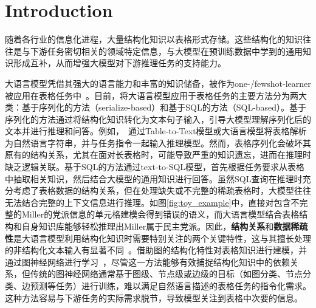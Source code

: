 \section{Introduction}
\begin{CJK}{UTF8}{gkai}  
随着各行业的信息化进程，大量结构化知识以表格形式存储。这些结构化的知识往往是与下游任务密切相关的领域特定信息，与大模型在预训练数据中学到的通用知识形成互补，从而增强大模型对下游推理任务的支持能力。

大语言模型凭借其强大的语言能力和丰富的知识储备，被作为one-/fewshot-learner被应用在表格任务中~\cite{?}。目前，将大语言模型应用于表格任务的主要方法分为两大类：基于序列化的方法（serialize-based）和基于SQL的方法（SQL-based）。基于序列化的方法通过将结构化知识转化为文本句子输入，引导大模型理解序列化后的文本并进行推理和问答。例如，~\cite{?}通过Table-to-Text模型或大语言模型将表格解析为自然语言字符串，并与任务指令一起输入推理模型。然而，表格序列化会破坏其原有的结构关系，尤其在面对长表格时，可能导致严重的知识遗忘，进而在推理时缺乏逻辑关联。基于SQL的方法通过text-to-SQL模型，首先根据任务要求从表格中抽取相关知识，然后结合大模型的通用知识进行回答。虽然SQL查询在推理时充分考虑了表格数据的结构关系，但在处理缺失或不完整的稀疏表格时，大模型往往无法结合完整的上下文信息进行推理。如图\ref{fig:toy_example}中，直接对包含不完整的Miller的党派信息的单元格建模会得到错误的语义，而大语言模型结合表格结构和自身知识库能够轻松推理出Miller属于民主党派。因此，\textbf{结构关系}和\textbf{数据稀疏性}是大语言模型利用结构化知识时需要特别关注的两个关键特性，这与其擅长处理的非结构化文本输入有显著不同~\cite{?}。借助图的结构化特性对表格知识进行建模，并通过图神经网络进行学习~\cite{?}，尽管这一方法能够有效捕捉结构化知识中的依赖关系，但传统的图神经网络通常基于图级、节点级或边级的目标（如图分类、节点分类、边预测等任务）进行训练，难以满足自然语言描述的表格任务的指令化需求。这种方法容易与下游任务的实际需求脱节，导致模型关注到表格中次要的信息。


\end{CJK}
